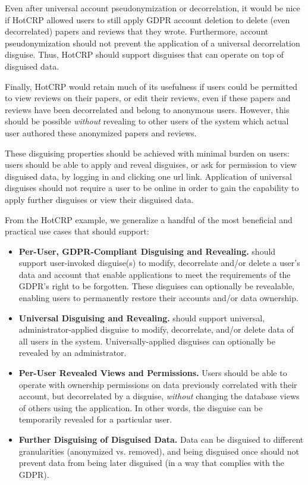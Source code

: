 Even after universal account pseudonymization or decorrelation, it would be nice if HotCRP allowed
users to still apply GDPR account deletion to delete (even decorrelated) papers and reviews that they
wrote. Furthermore, account pseudonymization should not prevent the application of a
universal decorrelation disguise. Thus, HotCRP should support disguises that can operate on top of
disguised data.

Finally, HotCRP would retain much of its usefulness if users could be permitted to view
reviews on their papers, or edit their reviews, even if these papers and reviews have been
decorrelated and belong to anonymous users.
However, this should be possible \emph{without} revealing to other users of the system which
actual user authored these anonymized papers and reviews.

 These disguising properties should be achieved with minimal burden on
users: users should be able to apply and reveal disguises, or ask for permission to view
disguised data, by \eg logging in and clicking one url link. Application of universal disguises
should not require a user to be online in order to gain the capability to apply further disguises or
view their disguised data.

From the HotCRP example, we generalize a handful of the most beneficial and practical use cases
that \sys should support:

\begin{itemize}
    \item\textbf{Per-User, GDPR-Compliant Disguising and Revealing.}
\sys should support user-invoked disguise(s) to modify, decorrelate and/or delete a user's data and
account that enable applications to meet the requirements of the GDPR's right to be forgotten.
%
These disguises can optionally be revealable, enabling users to \eg permanently restore their accounts and/or data ownership.

\item\textbf{Universal Disguising and Revealing.}
\sys should support universal, administrator-applied disguise to modify, decorrelate, and/or delete
        data of all users in the system.
%
Universally-applied disguises can optionally be revealed by an administrator.

\item\textbf{Per-User Revealed Views and Permissions.}
Users should be able to operate with ownership permissions on data previously correlated with their
account, but decorrelated by a disguise, \emph{without} changing the database views of others using
the application. In other words, the disguise can be temporarily revealed for a particular user.

\item\textbf{Further Disguising of Disguised Data.}
Data can be disguised to different granularities (\eg anonymized vs. removed), and being disguised
once should not prevent data from being later disguised (in a way that complies with the GDPR).
\end{itemize}


